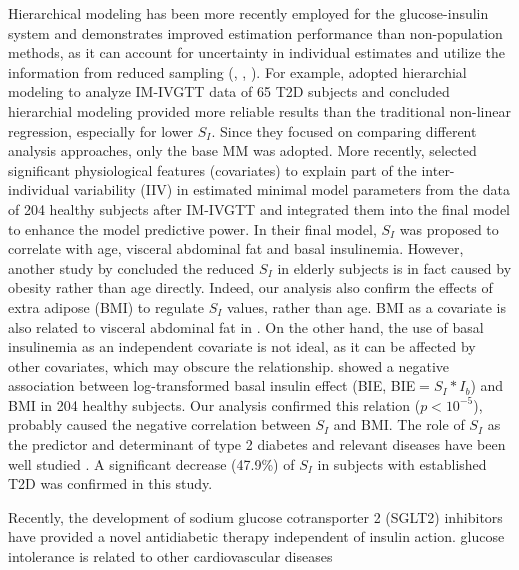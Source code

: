 \documentclass[utf8]{frontiersSCNS} %
\begin{document}
Hierarchical modeling has been more recently employed for the glucose-insulin system and demonstrates improved estimation performance than non-population methods, as it can account for uncertainty in individual estimates and utilize the information from reduced sampling (\citet{agbaje_2003}, \citet{Denti2009}, \citet{Denti2010}). For example, \citet{agbaje_2003} adopted hierarchial modeling to analyze IM-IVGTT data of 65 T2D subjects and concluded hierarchial modeling provided more reliable results than the traditional non-linear regression, especially for lower $S_I$. Since they focused on comparing different analysis approaches, only the base MM was adopted. More recently, \citet{Denti2010} selected significant physiological features (covariates) to explain part of the inter-individual variability (IIV) in estimated minimal model parameters from the data of 204 healthy subjects after IM-IVGTT and integrated them into the final model to enhance the model predictive power. In their final model, $S_I$ was proposed to correlate with age, visceral abdominal fat and basal insulinemia. However, another study by \citet{helen_2010_age} concluded the reduced $S_I$ in elderly subjects is in fact caused by obesity rather than age directly. Indeed, our analysis also confirm the effects of extra adipose (BMI) to regulate $S_I$ values, rather than age. BMI as a covariate is also related to visceral abdominal fat in \citet{Denti2010}. On the other hand, the use of basal insulinemia as an independent covariate is not ideal, as it can be affected by other covariates, which may obscure the relationship. \citet{SG_compo} showed a negative association between log-transformed basal insulin effect (BIE, BIE$=S_I*I_b$) and BMI in 204 healthy subjects. Our analysis confirmed this relation ($p<10^{-5}$), probably caused the negative correlation between $S_I$ and BMI. The role of $S_I$ as the predictor and determinant of type 2 diabetes and relevant diseases have been well studied \citep{Bergman1997TheTolerance}. A significant decrease (47.9\%) of $S_I$ in subjects with established T2D was confirmed in this study. 

Recently, the development of sodium glucose cotransporter 2 (SGLT2) inhibitors have provided a novel antidiabetic therapy independent of insulin action. 
glucose intolerance is related to other cardiovascular diseases
\end{document}
